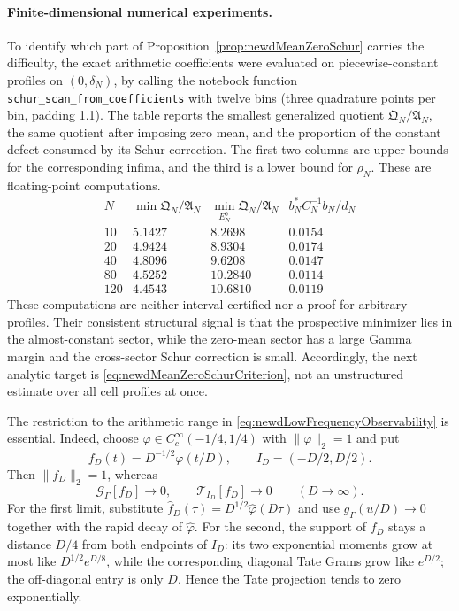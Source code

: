 \documentclass[11pt]{amsart}
\theoremstyle{definition}
\theoremstyle{remark}
\begin{document}
\paragraph{Finite-dimensional numerical experiments.}
To identify which part of Proposition~\ref{prop:newdMeanZeroSchur} carries
the difficulty, the exact arithmetic coefficients were evaluated on
piecewise-constant profiles on $(0,\delta_N)$, by calling the notebook
function \texttt{schur\_scan\_from\_coefficients} with twelve bins (three
quadrature points per bin, padding 1.1).  The
table reports the smallest generalized quotient
$\mathfrak Q_N/\mathfrak A_N$, the same quotient after imposing zero mean,
and the proportion of the constant defect consumed by its Schur correction.
The first two columns are upper bounds for the corresponding infima, and the
third is a lower bound for $\rho_N$.  These are floating-point
computations.
\[
\begin{array}{c|c|c|c}
N&\min \mathfrak Q_N/\mathfrak A_N&
\min_{E_N^0}\mathfrak Q_N/\mathfrak A_N&
b_N^*C_N^{-1}b_N/d_N\\ \hline
10 &5.1427&8.2698&0.0154\\
20 &4.9424&8.9304&0.0174\\
40 &4.8096&9.6208&0.0147\\
80 &4.5252&10.2840&0.0114\\
120&4.4543&10.6810&0.0119
\end{array}
\]
These computations are neither interval-certified
nor a proof for arbitrary profiles.  Their consistent structural signal is
that the prospective minimizer lies in the almost-constant sector, while
the zero-mean sector has a large Gamma margin and the cross-sector Schur
correction is small.  Accordingly, the next analytic target is
\eqref{eq:newdMeanZeroSchurCriterion}, not an unstructured estimate over
all cell profiles at once.

The restriction to the arithmetic range in
\eqref{eq:newdLowFrequencyObservability} is essential.  Indeed, choose
$\varphi\in C_c^\infty(-1/4,1/4)$ with $\|\varphi\|_2=1$ and put
\begin{equation}\label{eq:newdPlateauFamily}
 f_D(t)=D^{-1/2}\varphi(t/D),
 \qquad I_D=(-D/2,D/2).
\end{equation}
Then $\|f_D\|_2=1$, whereas
\begin{equation}\label{eq:newdPlateauEscape}
 \mathcal G_\Gamma[f_D]\longrightarrow0,
 \qquad
 \mathcal T_{I_D}[f_D]\longrightarrow0
 \qquad(D\to\infty).
\end{equation}
For the first limit, substitute
$\widehat f_D(\tau)=D^{1/2}\widehat\varphi(D\tau)$ and use
$g_\Gamma(u/D)\to0$ together with the rapid decay of
$\widehat\varphi$.  For the second, the support of $f_D$ stays a distance
$D/4$ from both endpoints of $I_D$: its two exponential moments grow at
most like $D^{1/2}e^{D/8}$, while the corresponding diagonal Tate Grams
grow like $e^{D/2}$; the off-diagonal entry is only $D$.  Hence the Tate
projection tends to zero exponentially.
\end{document}
